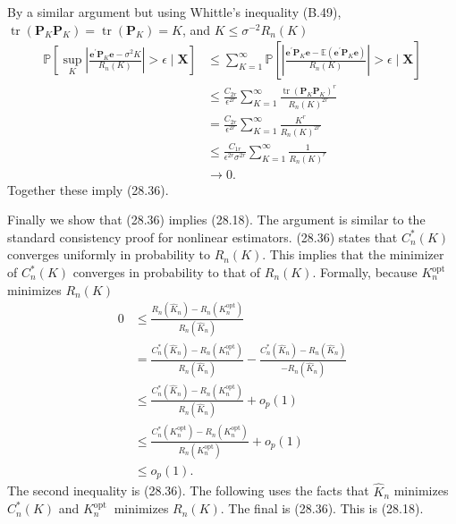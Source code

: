 \documentclass[10pt]{article}
\begin{document}
By a similar argument but using Whittle's inequality (B.49), $\operatorname{tr}\left(\boldsymbol{P}_{K} \boldsymbol{P}_{K}\right)=\operatorname{tr}\left(\boldsymbol{P}_{K}\right)=K$, and $K \leq \sigma^{-2} R_{n}(K)$
$$
\begin{aligned}
\mathbb{P}\left[\sup _{K}\left|\frac{\boldsymbol{e}^{\prime} \boldsymbol{P}_{K} \boldsymbol{e}-\sigma^{2} K}{R_{n}(K)}\right|>\epsilon \mid \boldsymbol{X}\right] & \leq \sum_{K=1}^{\infty} \mathbb{P}\left[\left|\frac{\boldsymbol{e}^{\prime} \boldsymbol{P}_{K} \boldsymbol{e}-\mathbb{E}\left(\boldsymbol{e}^{\prime} \boldsymbol{P}_{K} \boldsymbol{e}\right)}{R_{n}(K)}\right|>\epsilon \mid \boldsymbol{X}\right] \\
& \leq \frac{C_{2 r}}{\epsilon^{2 r}} \sum_{K=1}^{\infty} \frac{\operatorname{tr}\left(\boldsymbol{P}_{K} \boldsymbol{P}_{K}\right)^{r}}{R_{n}(K)^{2 r}} \\
&=\frac{C_{2 r}}{\epsilon^{2 r}} \sum_{K=1}^{\infty} \frac{K^{r}}{R_{n}(K)^{2 r}} \\
& \leq \frac{C_{1 r}}{\epsilon^{2 r} \sigma^{2 r}} \sum_{K=1}^{\infty} \frac{1}{R_{n}(K)^{r}} \\
& \rightarrow 0 .
\end{aligned}
$$
Together these imply (28.36).

Finally we show that (28.36) implies (28.18). The argument is similar to the standard consistency proof for nonlinear estimators. (28.36) states that $C_{n}^{*}(K)$ converges uniformly in probability to $R_{n}(K)$. This implies that the minimizer of $C_{n}^{*}(K)$ converges in probability to that of $R_{n}(K)$. Formally, because $K_{n}^{\mathrm{opt}}$ minimizes $R_{n}(K)$
$$
\begin{aligned}
0 & \leq \frac{R_{n}\left(\widehat{K}_{n}\right)-R_{n}\left(K_{n}^{\mathrm{opt}}\right)}{R_{n}\left(\widehat{K}_{n}\right)} \\
&=\frac{C_{n}^{*}\left(\widehat{K}_{n}\right)-R_{n}\left(K_{n}^{\mathrm{opt}}\right)}{R_{n}\left(\widehat{K}_{n}\right)}-\frac{C_{n}^{*}\left(\widehat{K}_{n}\right)-R_{n}\left(\widehat{K}_{n}\right)}{-R_{n}\left(\widehat{K}_{n}\right)} \\
& \leq \frac{C_{n}^{*}\left(\widehat{K}_{n}\right)-R_{n}\left(K_{n}^{\mathrm{opt}}\right)}{R_{n}\left(\widehat{K}_{n}\right)}+o_{p}(1) \\
& \leq \frac{C_{n}^{*}\left(K_{n}^{\mathrm{opt}}\right)-R_{n}\left(K_{n}^{\mathrm{opt}}\right)}{R_{n}\left(K_{n}^{\mathrm{opt}}\right)}+o_{p}(1) \\
& \leq o_{p}(1) .
\end{aligned}
$$
The second inequality is (28.36). The following uses the facts that $\widehat{K}_{n}$ minimizes $C_{n}^{*}(K)$ and $K_{n}^{\text {opt }}$ minimizes $R_{n}(K)$. The final is (28.36). This is (28.18).
\end{document}
